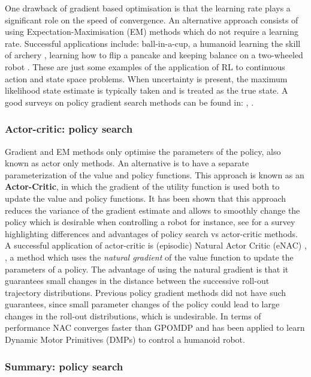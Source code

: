 One drawback of gradient based optimisation is that the learning rate  plays a significant role on the speed of convergence. 
An alternative approach consists of using Expectation-Maximisation (EM) methods \cite{PoWER_2009} which do not require a learning rate. Successful applications include: ball-in-a-cup, a humanoid learning the skill of archery \cite{archery_2010}, learning how to 
flip a pancake \cite{pancake_2010} and keeping balance on a two-wheeled robot \cite{Wang2016}. These are just some examples 
of the application of RL to continuous action and state space problems. When uncertainty is present, the maximum likelihood state estimate is typically taken 
and is treated as the true state. A good surveys on policy gradient search methods can be found in: \cite{p_search_surv_2011}, \cite{RL_robots_surv_2013}.

\subsubsection{Actor-critic: policy search}

Gradient and EM methods only optimise the parameters of the policy, also known as actor only methods. An alternative  
is to have a separate parameterization of the value and policy functions. This approach is known as an \textbf{Actor-Critic}, in which the gradient of the utility function is used both to update 
the value and policy functions. It has been shown that this approach reduces the variance of the gradient estimate and allows
to smoothly change the policy which is desirable when controlling a robot for instance, see \cite{ac_survey_2012} for a 
survey highlighting differences and advantages of policy search vs actor-critic methods. A successful application of actor-critic is (episodic) Natural Actor Critic (eNAC) \cite{eNAC_2003}, \cite{NAC_2008}, a method which uses the \textit{natural gradient} of the value function to update the parameters of a policy. The advantage of using the natural gradient is that it guarantees small changes in the distance between the successive roll-out trajectory distributions. Previous policy gradient methods did not have such guarantees, since small parameter changes of the policy could lead to large changes in the roll-out distributions, which is undesirable. In terms of performance NAC converges faster than GPOMDP and has been applied to learn Dynamic Motor Primitives (DMPs) to control a humanoid robot. 

\subsubsection{Summary: policy search}

